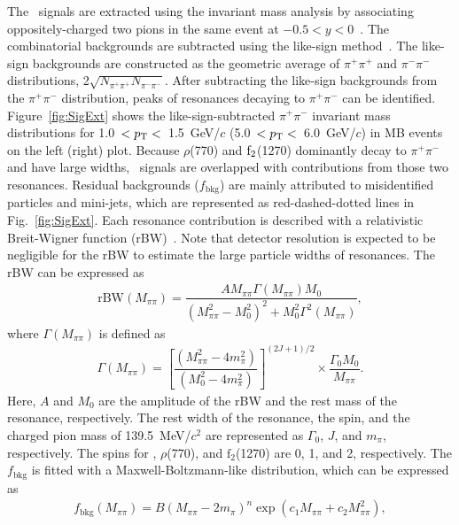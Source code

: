 The \fzero~signals are extracted using the invariant mass analysis by associating oppositely-charged two pions in the same event at $-0.5<y<0$~\cite{ALICE:2013wgn}. The combinatorial backgrounds are subtracted using the like-sign method~\cite{PhysRevD.36.2019}. The like-sign backgrounds are constructed as the geometric average of $\pi^{+}\pi^{+}$ and $\pi^{-}\pi^{-}$ distributions,  2$\sqrt{N_{\pi^{+}\pi^{+}}N_{\pi^{-}\pi^{-}}}$. After subtracting the like-sign backgrounds from the $\pi^{+}\pi^{-}$ distribution, peaks of resonances decaying to $\pi^{+}\pi^{-}$ can be identified. Figure~\ref{fig:SigExt} shows the like-sign-subtracted $\pi^{+}\pi^{-}$ invariant mass distributions for 1.0~$<p_{\rm{T}}<$~1.5~GeV/$c$ (5.0~$<p_{\rm{T}}<$~6.0~GeV/$c$) in MB events on the left (right) plot. Because $\rho$(770) and $\rm{f}_{2}$(1270) dominantly decay to $\pi^{+}\pi^{-}$ and have large widths, \fzero~signals are overlapped with contributions from those two resonances. Residual backgrounds ($f_{\mathrm{bkg}}$) are mainly attributed to misidentified particles and mini-jets, which are represented as red-dashed-dotted lines in Fig.~\ref{fig:SigExt}. Each resonance contribution is described with a relativistic Breit-Wigner function (rBW)~\cite{ALICE:2018qdv, ALICE:2022qnb}. Note that detector resolution is expected to be negligible for the rBW to estimate the large particle widths of resonances. The rBW can be expressed as
\begin{eqnarray}
\mathrm{rBW}(M_{\pi\pi}) = \dfrac{AM_{\pi\pi}\Gamma(M_{\pi\pi})M_{0}}{(M_{\pi\pi}^{2}-M_{0}^{2})^{2} + M_{0}^{2}\Gamma^{2}(M_{\pi\pi})},
\label{eq:rBW}
\end{eqnarray}
where $\Gamma(M_{\pi\pi})$ is defined as
\begin{eqnarray}
\Gamma(M_{\pi\pi}) = \left[ \dfrac{ (M_{\pi\pi}^{2} - 4m_{\pi}^{2}) }{ (M_{0}^{2}-4m_{\pi}^{2}) } \right]^{(2J+1)/2} \times \dfrac{\Gamma_{0}M_{0}}{M_{\pi\pi}} .
\label{eq:rBWW}
\end{eqnarray}
Here, $A$ and $M_{0}$ are the amplitude of the rBW and the rest mass of the resonance, respectively. The rest width of the resonance, the spin, and the charged pion mass of 139.5~MeV/$c^{2}$ are represented as $\Gamma_{0}$, $J$, and $m_{\pi}$, respectively. The spins for \fzero, $\rho$(770), and $\mathrm{f}_{2}$(1270) are 0, 1, and 2, respectively. The $f_{\mathrm{bkg}}$ is fitted with a Maxwell-Boltzmann-like distribution, which can be expressed as~\cite{OPAL:1998enc}
\begin{eqnarray}
f_{\mathrm{bkg}}(M_{\pi\pi}) = B(M_{\pi\pi}-2m_{\pi})^{n}\exp{(c_{1}M_{\pi\pi} + c_{2}M_{\pi\pi}^{2})},
\label{eq:bkg}
\end{eqnarray} 
